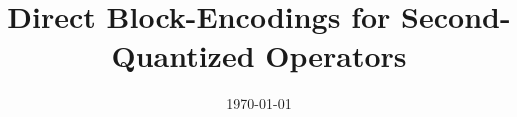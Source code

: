 






\title{Direct Block-Encodings for Second-Quantized Operators}


\date{\today} 

 

\maketitle











\appendix











